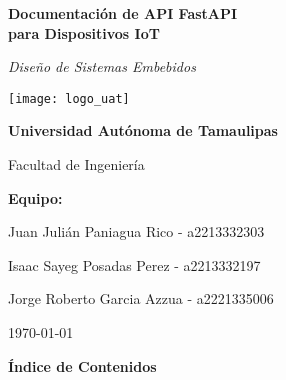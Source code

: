 \documentclass[12pt,letterpaper]{report}
\begin{document}
\begin{titlepage}
    \centering
    \vspace*{1cm}
    {\Huge\bfseries Documentación de API FastAPI\\para Dispositivos IoT\par}
    \vspace{2cm}
    {\Large\itshape Diseño de Sistemas Embebidos\par}
    \vspace{3cm}

    \texttt{[image: logo\_uat]}\\

    \vspace{3cm}

    {\Large\bfseries Universidad Autónoma de Tamaulipas\par}
    \vspace{0.5cm}
    {\large Facultad de Ingeniería\par}
    \vspace{1.5cm}

    {\large\bfseries Equipo:\par}
    \vspace{0.5cm}
    {\large Juan Julián Paniagua Rico - a2213332303\par}
    {\large Isaac Sayeg Posadas Perez - a2213332197\par}
    {\large Jorge Roberto Garcia Azzua - a2221335006\par}
    \vspace{1.5cm}

    {\large \today\par}
\end{titlepage}

\cleardoublepage
{}
{}
\renewcommand{\contentsname}{Índice de Contenidos}
\setcounter{tocdepth}{3}
\setcounter{secnumdepth}{3}

\begin{center}
    \vspace*{1cm}
    {\Huge\bfseries Índice de Contenidos}
    \vspace{0.5cm}

    \noindent\makebox[\linewidth]{\rule{\textwidth}{0.4pt}}
    \vspace{1cm}
\end{center}
\end{document}
